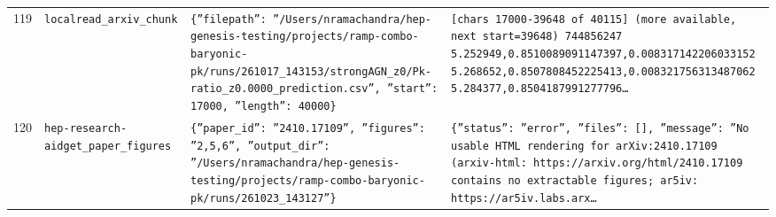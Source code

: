 \documentclass[11pt,a4paper]{article}
\begin{document}
\begin{longtable}{@{}p{}p{}p{}p{}@{}}
119 & \texttt{local}\newline\texttt{read\_\allowbreak{}arxiv\_\allowbreak{}chunk} & \texttt{\{''filepath'':\allowbreak{} ''/\allowbreak{}Users/\allowbreak{}nramachandra/\allowbreak{}hep-genesis-testing/\allowbreak{}projects/\allowbreak{}ramp-combo-baryonic-pk/\allowbreak{}runs/\allowbreak{}261017\_\allowbreak{}143153/\allowbreak{}strongAGN\_\allowbreak{}z0/\allowbreak{}Pk-ratio\_\allowbreak{}z0.0000\_\allowbreak{}prediction.csv'',\allowbreak{} ''start'':\allowbreak{} 17000,\allowbreak{} ''length'':\allowbreak{} 40000\}\allowbreak{}} & \texttt{[chars 17000-39648 of 40115]\allowbreak{} (more available,\allowbreak{} next start=\allowbreak{}39648)\allowbreak{}  744856247 5.252949,\allowbreak{}0.8510089091147397,\allowbreak{}0.008317142206033152 5.268652,\allowbreak{}0.8507808452225413,\allowbreak{}0.008321756313487062 5.284377,\allowbreak{}0.8504187991277796\ldots{}\allowbreak{}} \\
120 & \texttt{hep-research-aid}\newline\texttt{get\_\allowbreak{}paper\_\allowbreak{}figures} & \texttt{\{''paper\_\allowbreak{}id'':\allowbreak{} ''2410.17109'',\allowbreak{} ''figures'':\allowbreak{} ''2,\allowbreak{}5,\allowbreak{}6'',\allowbreak{} ''output\_\allowbreak{}dir'':\allowbreak{} ''/\allowbreak{}Users/\allowbreak{}nramachandra/\allowbreak{}hep-genesis-testing/\allowbreak{}projects/\allowbreak{}ramp-combo-baryonic-pk/\allowbreak{}runs/\allowbreak{}261023\_\allowbreak{}143127''\}\allowbreak{}} & \texttt{\{''status'':\allowbreak{} ''error'',\allowbreak{} ''files'':\allowbreak{} []\allowbreak{},\allowbreak{} ''message'':\allowbreak{} ''No usable HTML rendering for arXiv:\allowbreak{}2410.17109 (arxiv-html:\allowbreak{} https:\allowbreak{}/\allowbreak{}/\allowbreak{}arxiv.org/\allowbreak{}html/\allowbreak{}2410.17109 contains no extractable figures;\allowbreak{} ar5iv:\allowbreak{} https:\allowbreak{}/\allowbreak{}/\allowbreak{}ar5iv.labs.arx\ldots{}\allowbreak{}} \\

\end{longtable}
\end{document}
